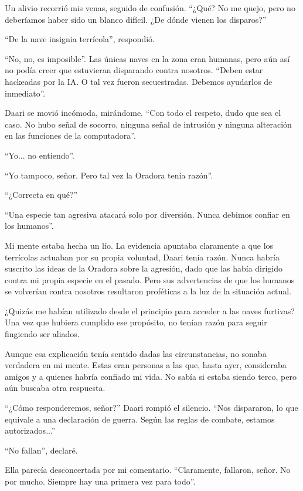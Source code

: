 \documentclass[spanish,12pt,a4paper,oneside,titlepage]{book}
\begin{document}
    Un alivio recorrió mis venas, seguido de confusión. ``¿Qué? No me quejo, pero no deberíamos haber sido un blanco difícil. ¿De dónde vienen los disparos?''

    ``De la nave insignia terrícola'', respondió.

    ``No, no, es imposible''. Las únicas naves en la zona eran humanas, pero aún así no podía creer que estuvieran disparando contra nosotros. ``Deben estar hackeadas por la IA. O tal vez fueron secuestradas. Debemos ayudarlos de inmediato''.

    Daari se movió incómoda, mirándome. ``Con todo el respeto, dudo que sea el caso. No hubo señal de socorro, ninguna señal de intrusión y ninguna alteración en las funciones de la computadora''.

    ``Yo... no entiendo''.

    ``Yo tampoco, señor. Pero tal vez la Oradora tenía razón''.

    ``¿Correcta en qué?''

    ``Una especie tan agresiva atacará solo por diversión. Nunca debimos confiar en los humanos''.

    Mi mente estaba hecha un lío. La evidencia apuntaba claramente a que los terrícolas actuaban por su propia voluntad, Daari tenía razón. Nunca habría suscrito las ideas de la Oradora sobre la agresión, dado que las había dirigido contra mi propia especie en el pasado. Pero sus advertencias de que los humanos se volverían contra nosotros resultaron proféticas a la luz de la situación actual.

    ¿Quizás me habían utilizado desde el principio para acceder a las naves furtivas? Una vez que hubiera cumplido ese propósito, no tenían razón para seguir fingiendo ser aliados.

    Aunque esa explicación tenía sentido dadas las circunstancias, no sonaba verdadera en mi mente. Estas eran personas a las que, hasta ayer, consideraba amigos y a quienes habría confiado mi vida. No sabía si estaba siendo terco, pero aún buscaba otra respuesta.

    ``¿Cómo responderemos, señor?'' Daari rompió el silencio. ``Nos dispararon, lo que equivale a una declaración de guerra. Según las reglas de combate, estamos autorizados...''

    ``No fallan'', declaré.

    Ella parecía desconcertada por mi comentario. ``Claramente, fallaron, señor. No por mucho. Siempre hay una primera vez para todo''.
\end{document}
